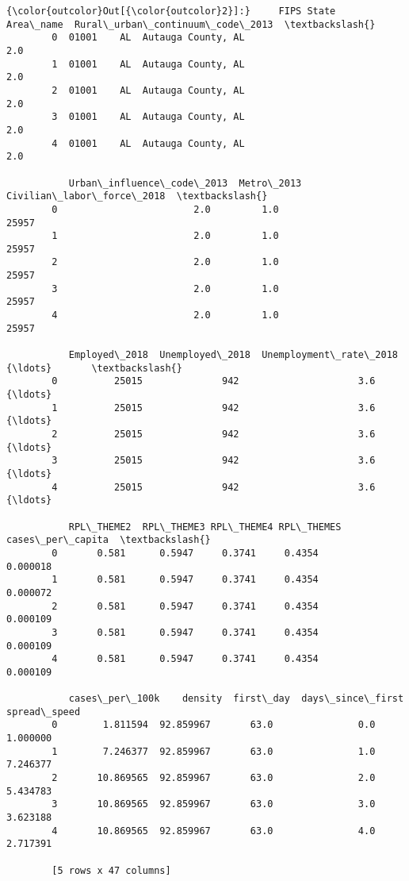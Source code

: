 \documentclass[11pt]{article}
\begin{document}
\begin{Verbatim}[commandchars=\\\{\}]
{\color{outcolor}Out[{\color{outcolor}2}]:}     FIPS State           Area\_name  Rural\_urban\_continuum\_code\_2013  \textbackslash{}
        0  01001    AL  Autauga County, AL                              2.0   
        1  01001    AL  Autauga County, AL                              2.0   
        2  01001    AL  Autauga County, AL                              2.0   
        3  01001    AL  Autauga County, AL                              2.0   
        4  01001    AL  Autauga County, AL                              2.0   
        
           Urban\_influence\_code\_2013  Metro\_2013  Civilian\_labor\_force\_2018  \textbackslash{}
        0                        2.0         1.0                      25957   
        1                        2.0         1.0                      25957   
        2                        2.0         1.0                      25957   
        3                        2.0         1.0                      25957   
        4                        2.0         1.0                      25957   
        
           Employed\_2018  Unemployed\_2018  Unemployment\_rate\_2018     {\ldots}       \textbackslash{}
        0          25015              942                     3.6     {\ldots}        
        1          25015              942                     3.6     {\ldots}        
        2          25015              942                     3.6     {\ldots}        
        3          25015              942                     3.6     {\ldots}        
        4          25015              942                     3.6     {\ldots}        
        
           RPL\_THEME2  RPL\_THEME3 RPL\_THEME4 RPL\_THEMES cases\_per\_capita  \textbackslash{}
        0       0.581      0.5947     0.3741     0.4354         0.000018   
        1       0.581      0.5947     0.3741     0.4354         0.000072   
        2       0.581      0.5947     0.3741     0.4354         0.000109   
        3       0.581      0.5947     0.3741     0.4354         0.000109   
        4       0.581      0.5947     0.3741     0.4354         0.000109   
        
           cases\_per\_100k    density  first\_day  days\_since\_first spread\_speed  
        0        1.811594  92.859967       63.0               0.0     1.000000  
        1        7.246377  92.859967       63.0               1.0     7.246377  
        2       10.869565  92.859967       63.0               2.0     5.434783  
        3       10.869565  92.859967       63.0               3.0     3.623188  
        4       10.869565  92.859967       63.0               4.0     2.717391  
        
        [5 rows x 47 columns]
\end{Verbatim}
            
\end{document}
